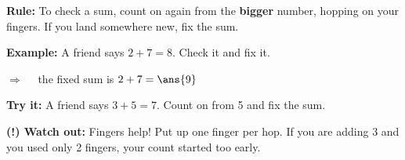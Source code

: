 \documentclass[12pt]{article}
\begin{document}

\begin{formulabox}
\textbf{Rule:} To check a sum, count on again from the \textbf{bigger}
number, hopping on your fingers. If you land somewhere new, fix the sum.
\end{formulabox}

\begin{examplebox}
\textbf{Example:} \quad A friend says $2+7=8$. Check it and fix it.

$\Rightarrow\quad$ the fixed sum is $2 + 7 = \ans{9}$
\end{examplebox}

\begin{tryitbox}
\textbf{Try it:} \quad A friend says $3+5=7$. Count on from 5 and fix the
sum.\\[2pt]
\end{tryitbox}

\begin{watchoutbox}
\textbf{(!) Watch out:} Fingers help! Put up one finger per hop. If you are
adding 3 and you used only 2 fingers, your count started too early.
\end{watchoutbox}
\end{document}
